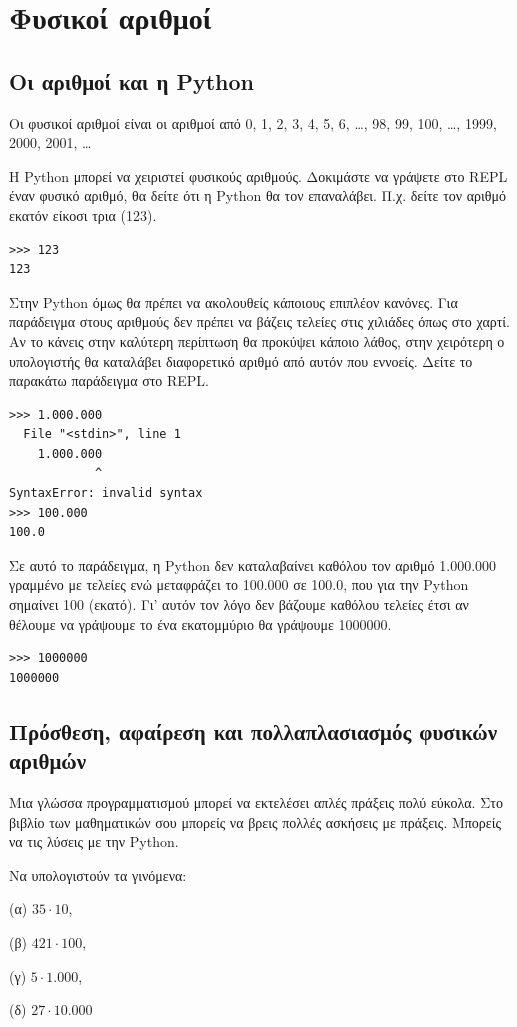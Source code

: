 \chapter{Φυσικοί αριθμοί}

\section{Οι αριθμοί και η Python}

Οι φυσικοί αριθμοί είναι οι αριθμοί από 0, 1, 2, 3, 4, 5, 6, \ldots, 98, 99, 100, \ldots, 1999, 2000, 2001, \ldots

Η Python μπορεί να χειριστεί φυσικούς αριθμούς. Δοκιμάστε να γράψετε στο REPL έναν φυσικό αριθμό, θα δείτε ότι η Python θα τον επαναλάβει. Π.χ. δείτε τον αριθμό εκατόν είκοσι τρια (123).
\begin{lstlisting}
>>> 123
123
\end{lstlisting}

Στην Python όμως θα πρέπει να ακολουθείς κάποιους επιπλέον κανόνες. Για παράδειγμα στους αριθμούς δεν πρέπει να βάζεις τελείες στις χιλιάδες όπως στο χαρτί. Αν το κάνεις στην καλύτερη περίπτωση θα προκύψει κάποιο λάθος, στην χειρότερη ο υπολογιστής θα καταλάβει διαφορετικό αριθμό από αυτόν που εννοείς.
Δείτε το παρακάτω παράδειγμα στο REPL.
\begin{lstlisting}
>>> 1.000.000
  File "<stdin>", line 1
    1.000.000
            ^
SyntaxError: invalid syntax
>>> 100.000
100.0
\end{lstlisting}
Σε αυτό το παράδειγμα, η Python δεν καταλαβαίνει καθόλου τον αριθμό 1.000.000 γραμμένο με τελείες ενώ μεταφράζει το 100.000 σε 100.0, που για την Python σημαίνει 100 (εκατό). Γι' αυτόν τον λόγο δεν βάζουμε καθόλου τελείες έτσι αν θέλουμε να γράψουμε το ένα εκατομμύριο θα γράψουμε 1000000.
\begin{lstlisting}
>>> 1000000
1000000
\end{lstlisting}

\section{Πρόσθεση, αφαίρεση και πολλαπλασιασμός φυσικών αριθμών}
Μια γλώσσα προγραμματισμού μπορεί να εκτελέσει απλές πράξεις πολύ εύκολα. Στο βιβλίο των μαθηματικών  σου μπορείς να βρεις πολλές ασκήσεις με πράξεις. Μπορείς να τις λύσεις με την Python.

\begin{exercise}
Να υπολογιστούν τα γινόμενα: 

(α) $35 \cdot 10$, 

(β) $421 \cdot 100$,

(γ) $5 \cdot 1.000$,

(δ) $27 \cdot 10.000$
\end{exercise}

